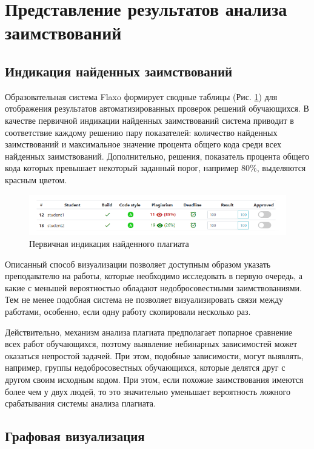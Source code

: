 \documentclass[a4paper,14pt]{extarticle}
\begin{document}
\section{Представление результатов анализа заимствований}

\subsection{Индикация найденных заимствований}

Образовательная система Flaxo формирует сводные таблицы (Рис. \ref{fig:plagiarismIndication}) для отображения результатов автоматизированных проверок решений обучающихся. В качестве первичной индикации найденных заимствований система приводит в соответствие каждому решению пару показателей: количество найденных заимствований и максимальное значение процента общего кода среди всех найденных заимствований. Дополнительно, решения, показатель процента общего кода которых превышает некоторый заданный порог, например 80\%, выделяются красным цветом.

\begin{figure}[h!]
\centering
\includegraphics[width=1.0\textwidth]{plagiarismIndication.png}
\caption{Первичная индикация найденного плагиата}
\label{fig:plagiarismIndication}
\end{figure}

Описанный способ визуализации позволяет доступным образом указать преподавателю на работы, которые необходимо исследовать в первую очередь, а какие с меньшей вероятностью обладают недобросовестными заимствованиями. Тем не менее подобная система не позволяет визуализировать связи между работами, особенно, если одну работу скопировали несколько раз.

Действительно, механизм анализа плагиата предполагает попарное сравнение всех работ обучающихся, поэтому выявление небинарных зависимостей может оказаться непростой задачей. При этом, подобные зависимости, могут выявлять, например, группы недобросовестных обучающихся, которые делятся друг с другом своим исходным кодом. При этом, если похожие заимствования имеются более чем у двух людей, то это значительно уменьшает вероятность ложного срабатывания системы анализа плагиата.

\subsection{Графовая визуализация}
\end{document}
